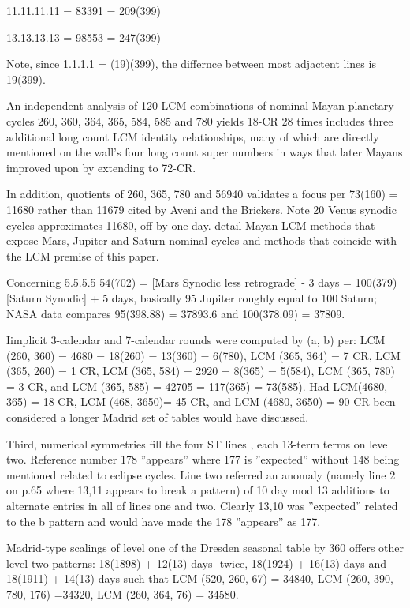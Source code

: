 \documentclass[12pt]{article}
\begin{document}
11.11.11.11 = 83391 = 209(399)

13.13.13.13 = 98553 = 247(399)

Note, since 1.1.1.1  = (19)(399), the differnce between most adjactent lines is 19(399).

An independent analysis of 120 LCM combinations of nominal Mayan  planetary cycles 260, 360, 364, 365, 584, 585 and 780 yields 18-CR 28 times includes three additional long count LCM identity relationships, many of which are directly mentioned on the wall's four long count super numbers in ways that later Mayans improved upon by extending to 72-CR. 

In addition, quotients of 260, 365, 780 and 56940 validates a  focus per  73(160) = 11680 rather than 11679 cited by Aveni and the Brickers. Note 20 Venus synodic cycles approximates 11680, off by one day.   detail Mayan LCM methods that expose Mars, Jupiter and Saturn nominal cycles and  methods that coincide with the LCM premise of  this paper.

Concerning 5.5.5.5  54(702) = [Mars Synodic less retrograde] - 3 days = 100(379) [Saturn Synodic] + 5 days, basically  95 Jupiter roughly equal to 100 Saturn;  NASA data compares 95(398.88) = 37893.6 and 100(378.09) = 37809.

Iimplicit 3-calendar and 7-calendar rounds were computed by  (a, b) per: LCM (260, 360) = 4680 = 18(260) = 13(360) = 6(780), LCM (365, 364) = 7 CR, LCM (365, 260) = 1 CR, LCM (365, 584) = 2920 = 8(365) = 5(584), LCM (365, 780) = 3 CR, and LCM (365, 585) = 42705 = 117(365) = 73(585). Had LCM(4680, 365) = 18-CR, LCM (468, 3650)= 45-CR, and LCM (4680, 3650) = 90-CR been considered  a longer Madrid set of tables would have discussed.
 
Third, numerical symmetries fill  the four ST lines ,  each 13-term terms on level two. Reference number 178 ”appears” where 177 is ”expected” without 148 being mentioned related to eclipse cycles. Line two referred an anomaly (namely line 2 on p.65 where 13,11 appears to break a pattern) of 10 day mod 13 additions to alternate entries in all of lines one and two. Clearly 13,10 was ”expected” related to the b pattern and would have made the 178 ”appears” as 177. 

Madrid-type scalings of level one of the Dresden seasonal table by 360 offers other level two patterns: 18(1898) + 12(13) days- twice, 18(1924) + 16(13) days and 18(1911) + 14(13) days such that LCM (520, 260, 67) = 34840, LCM (260, 390, 780, 176) =34320, LCM (260, 364, 76) = 34580. 
\end{document}
